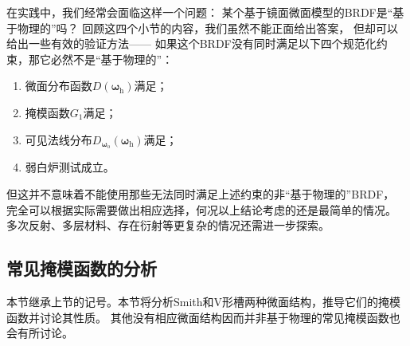 在实践中，我们经常会面临这样一个问题：
某个基于镜面微面模型的BRDF是“基于物理的”吗？
回顾这四个小节的内容，我们虽然不能正面给出答案，
但却可以给出一些有效的验证方法——
如果这个BRDF没有同时满足以下四个规范化约束，那它必然不是“基于物理的”：
\begin{enumerate}
    \item 微面分布函数$D({\bm\omega}_{\mathrm{h}})$满足；
    \item 掩模函数$G_1$满足；
    \item 可见法线分布$D_{{\bm\omega}_{\mathrm{o}}}({\bm\omega}_{\mathrm{h}})$满足；
    \item 弱白炉测试成立。
\end{enumerate}
但这并不意味着不能使用那些无法同时满足上述约束的非“基于物理的”BRDF，
完全可以根据实际需要做出相应选择，何况以上结论考虑的还是最简单的情况。
多次反射、多层材料、存在衍射等更复杂的情况还需进一步探索。

\subsection{常见掩模函数的分析}\label{sub:常见掩模函数的分析}
本节继承上节的记号。本节将分析Smith和V形槽两种微面结构，推导它们的掩模函数并讨论其性质。
其他没有相应微面结构因而并非基于物理的常见掩模函数也会有所讨论。

